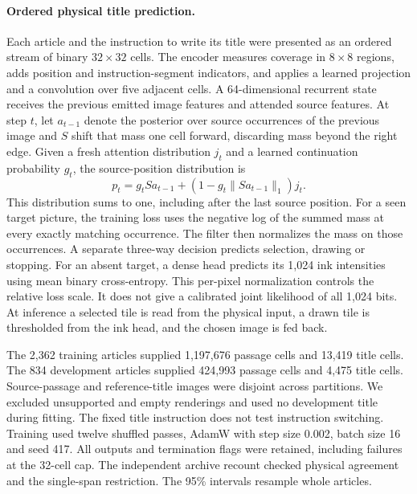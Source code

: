 \documentclass[12pt,a4paper]{article}
\providecommand{\DIFadd}[1]{{\protect\color{blue} \sf #1}} %
\begin{document}
\paragraph{\DIFadd{Ordered physical title prediction.}}
\DIFadd{Each article and the instruction to write its title were presented as an
ordered stream of binary $32\times32$ cells. The encoder measures coverage
in $8\times8$ regions, adds position and instruction-segment indicators,
and applies a learned projection and a convolution over five adjacent
cells. A 64-dimensional recurrent state receives the previous emitted
image features and attended source features. At step $t$, let $a_{t-1}$
denote the posterior over source occurrences of the previous image and $S$
shift that mass one cell forward, discarding mass beyond the right edge.
Given a fresh attention distribution $j_t$ and a learned continuation
probability $g_t$, the source-position distribution is
}\[
 p_t=g_t S a_{t-1}+(1-g_t\lVert S a_{t-1}\rVert_1)j_t.
\]
\DIFadd{This distribution sums to one, including after the last source position.
For a seen target picture, the training loss uses the negative log of the
summed mass at every exactly matching occurrence. The filter then
normalizes the mass on those occurrences. A separate three-way decision
predicts selection, drawing or stopping. For an absent target, a dense
head predicts its 1,024 ink intensities using mean binary cross-entropy.
This per-pixel normalization controls the relative loss scale. It does not
give a calibrated joint likelihood of all 1,024 bits. At inference a
selected tile is read from the physical input, a drawn tile is thresholded
from the ink head, and the chosen image is fed back.
}

\DIFadd{The 2,362 training articles supplied 1,197,676 passage cells and 13,419
title cells. The 834 development articles supplied 424,993 passage cells
and 4,475 title cells. Source-passage and reference-title images were
disjoint across partitions. We excluded unsupported and empty renderings
and used no development title during fitting. The fixed title instruction
does not test instruction switching. Training used twelve shuffled passes,
AdamW with step size 0.002, batch size 16 and seed 417. All outputs and
termination flags were retained, including failures at the 32-cell cap.
The independent archive recount checked physical agreement and the
single-span restriction. The 95\% intervals resample whole articles.
}
\end{document}
